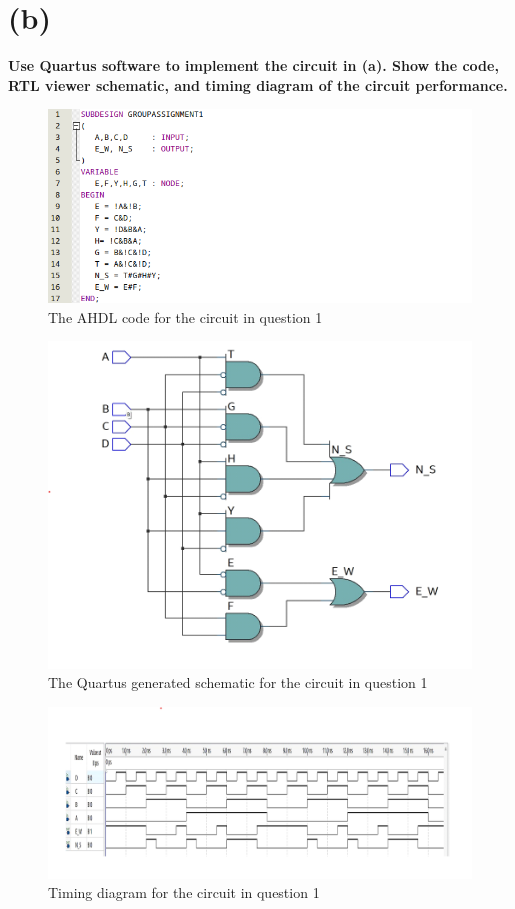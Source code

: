 \documentclass[a4paper,12]{article}
\begin{document}
\section*{(b)} \textbf{ Use Quartus software to implement the circuit in (a). Show the code, RTL
viewer schematic, and timing diagram of the circuit performance.}

\begin{figure}[H]
    \centering
    \includegraphics[width=\linewidth]{q1code.png}
    \caption{The AHDL code for the circuit in question 1}
    \label{fig:q1code}  
\end{figure}
\begin{figure}[H]
    \centering
    \includegraphics[width=\linewidth]{q1schem.png}
    \caption{The Quartus generated schematic for the circuit in question 1}
    \label{fig:q1schem}    
\end{figure}
\begin{figure}[H]
    \centering
    \includegraphics[width=\linewidth]{q1tim.png}
    \caption{Timing diagram for the circuit in question 1}
    \label{fig:q1timi}    
\end{figure}
\end{document}
